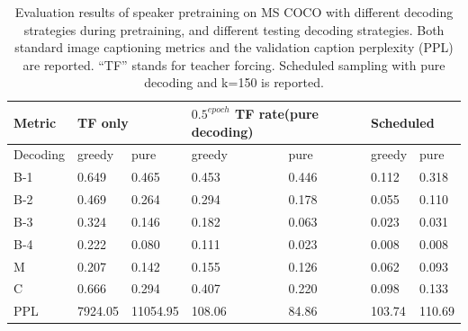 \begin{table}[]
	\begin{tabularx}{\textwidth}{|l|ll|ll|ll|}
		\hline
		\textbf{Metric} & \multicolumn{2}{l|}{\textbf{TF only}}   & \multicolumn{2}{X|}{\textbf{$0.5^{epoch}$ TF rate\newline(pure decoding)}} & \multicolumn{2}{l|}{\textbf{Scheduled}} \\ \hline
		Decoding& \multicolumn{1}{l|}{greedy}  & pure     & \multicolumn{1}{l|}{greedy}                       & pure                        & \multicolumn{1}{l|}{greedy}   & pure    \\ \hline
		B-1             & \multicolumn{1}{l|}{0.649}   & 0.465    & \multicolumn{1}{l|}{0.453}                        & 0.446                       & \multicolumn{1}{l|}{0.112}    & 0.318   \\ \hline
		B-2             & \multicolumn{1}{l|}{0.469}   & 0.264    & \multicolumn{1}{l|}{0.294}                        & 0.178                       & \multicolumn{1}{l|}{0.055}    & 0.110   \\ \hline
		B-3             & \multicolumn{1}{l|}{0.324}   & 0.146    & \multicolumn{1}{l|}{0.182}                        & 0.063                       & \multicolumn{1}{l|}{0.023}    & 0.031   \\ \hline
		B-4             & \multicolumn{1}{l|}{0.222}   & 0.080    & \multicolumn{1}{l|}{0.111}                        & 0.023                       & \multicolumn{1}{l|}{0.008}    & 0.008   \\ \hline
		M               & \multicolumn{1}{l|}{0.207}   & 0.142    & \multicolumn{1}{l|}{0.155}                        & 0.126                       & \multicolumn{1}{l|}{0.062}    & 0.093   \\ \hline
		C               & \multicolumn{1}{l|}{0.666}   & 0.294    & \multicolumn{1}{l|}{0.407}                        & 0.220                       & \multicolumn{1}{l|}{0.098}    & 0.133   \\ \hline
		PPL  & \multicolumn{1}{l|}{7924.05} & 11054.95 & \multicolumn{1}{l|}{108.06}                       & 84.86                       & \multicolumn{1}{l|}{103.74}   & 110.69  \\ \hline
		
	\end{tabularx}
\caption{\label{coco_grid_searches_speaker_pretrain}Evaluation results of speaker pretraining on MS COCO with different decoding strategies during pretraining, and different testing decoding strategies. Both standard image captioning metrics and the validation caption perplexity (PPL) are reported. ``TF'' stands for teacher forcing. Scheduled sampling with pure decoding and k=150 is reported.}
\end{table}

